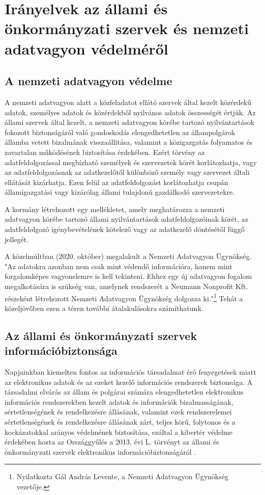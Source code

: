 \section{Irányelvek az állami és önkormányzati szervek és nemzeti adatvagyon védelméről}

\subsection*{A nemzeti adatvagyon védelme}

A nemzeti adatvagyon alatt a közfeladatot ellátó szervek által kezelt közérdekű adatok, személyes adatok és közérdekből nyilvános adatok összességét értjük. Az állami szervek által kezelt, a nemzeti adatvagyon körébe tartozó nyilvántartások fokozott biztonságáról való gondoskodás elengedhetetlen az állampolgárok államba vetett bizalmának visszaállítása, valamint a közigazgatás folyamatos és zavartalan működésének biztosítása érdekében. Ezért törvény az adatfeldolgozással megbízható személyek és szervezetek körét korlátozhatja, vagy az adatfeldolgozásnak az adatkezelőtől különböző személy vagy szervezet általi ellátását kizárhatja. Ezen felül az adatfeldolgozást korlátozhatja csupán államigazgatási vagy kizárólag állami tulajdonú gazdálkodó szervezetekre. \cite{2010-CLVII-torveny}

A kormány létrehozott egy mellékletet, amely meghatározza a nemzeti adatvagyon körébe tartozó állami nyilvántartások adatfeldolgozóinak körét, az adatfeldolgozó igénybevételének kötelező vagy az adatkezelő döntésétől függő jellegét. \cite{38/2011}

A közelmúltban (2020. október) megalakult a Nemzeti Adatvagyon Ügynökség. "Az adatokra azonban nem csak mint védendő információra, hanem mint forgalomképes vagyonelemre is kell tekinteni. Ehhez egy új adatvagyon fogalom megalkotására is szükség van, amelynek rendszerét a Neumann Nonprofit Kft. részeként létrehozott Nemzeti Adatvagyon Ügynökség dolgozza ki."\footnote{Nyilatkozta Gál András Levente, a Nemzeti Adatvagyon Ügynökség vezetője.} Tehát a közeljövőben ezen a téren további átalakulásokra számíthatunk.

\subsection*{Az állami és önkormányzati szervek információbiztonsága}

Napjainkban kiemelten fontos az információs társadalmat érő fenyegetések miatt az elektronikus adatok és az ezeket kezelő információs rendszerek biztonsága. A társadalmi elvárás az állam és polgárai számára elengedhetetlen elektronikus információs rendszerekben kezelt adatok és információk bizalmasságának, sértetlenségének és rendelkezésre állásának, valamint ezek rendszerelemei sértetlenségének és rendelkezésre állásának zárt, teljes körű, folytonos és a kockázatokkal arányos védelmének biztosítása, ezáltal a kibertér védelme érdekében hozta az Országgyűlés a 2013. évi L. törvényt az állami és önkormányzati szervek elektronikus információbiztonságáról \cite{2013-L-torveny}.


